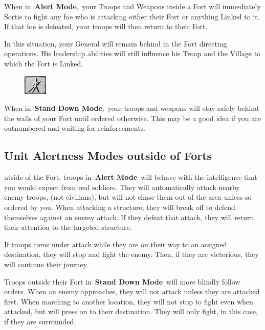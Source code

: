 When in \textbf{Alert Mode}, your Troops and Weapons inside a Fort will immediately Sortie to fight any foe who is attacking either their Fort or anything Linked to it. If that foe is defeated, your troops will then return to their Fort.

In this situation, your General will remain behind in the Fort directing operations. His leadership abilities will still influence his Troop and the Village to which the Fort is Linked.

\begin{figure}
	\vspace{-20pt}
	\begin{center}
		\includegraphics[width=0.1\textwidth]{Tstanddown}
	\end{center}
	\vspace{-20pt}
\end{figure}

When in \textbf{Stand Down Mode}, your troops and weapons will stay safely behind the walls of your Fort until ordered otherwise. This may be a good idea if you are outnumbered and waiting for reinforcements.

\subsection{Unit Alertness Modes outside of Forts}


utside of the Fort, troops in \textbf{Alert Mode} will behave with the intelligence that you would expect from real soldiers. They will automatically attack nearby enemy troops, (not civilians), but will not chase them out of the area unless so ordered by you. When attacking a structure, they will break off to defend themselves against an enemy attack. If they defeat that attack, they will return their attention to the targeted structure.

If troops come under attack while they are on their way to an assigned destination, they will stop and fight the enemy. Then, if they are victorious, they will continue their journey.

Troops outside their Fort in \textbf{Stand Down Mode} will more blindly follow orders. When an enemy approaches, they will not attack unless they are attacked first. When marching to another location, they will not stop to fight even when attacked, but will press on to their destination. They will only fight, in this case, if they are surrounded.

